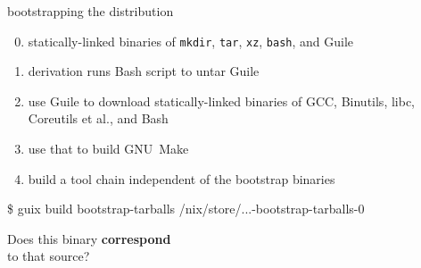 \documentclass{beamer}
\begin{document}
\begin{frame}[fragile]{bootstrapping the distribution}
  \begin{enumerate}
    \setcounter{enumi}{-1}
    \item<1-> statically-linked binaries of \texttt{mkdir}, \texttt{tar},
      \texttt{xz}, \texttt{bash}, and Guile
    \item<2-> derivation runs Bash script to untar Guile
    \item<3-> use Guile to download statically-linked binaries of GCC,
      Binutils, libc, Coreutils et al., and Bash
    \item<4-> use that to build GNU~Make
    \item<5-> build a tool chain independent of the bootstrap binaries
  \end{enumerate}

\end{frame}

\begin{frame}[fragile]
  \begin{semiverbatim}
\$ guix build bootstrap-tarballs
/nix/store/\textrm{...}-bootstrap-tarballs-0
  \end{semiverbatim}
  \begin{semiverbatim}
  \end{semiverbatim}
\end{frame}

\begin{frame}[plain]
  \LARGE{Does this binary \alert{\textbf{correspond}}\\[3mm]
    to that source?}
\end{frame}
\end{document}
